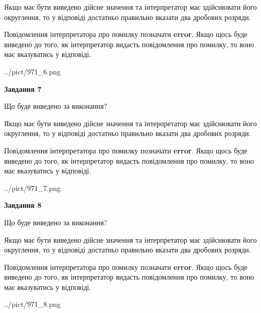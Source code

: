 \documentclass[12pt, ukrainian]{article}
\begin{document}
{\begin {Large}
Якщо має бути виведено дійсне значення та інтерпретатор має здійснювати його округлення, 
то у відповіді достатньо правильно вказати два дробових розряди.

Повідомлення інтерпретатора про помилку позначати \textbf{error}.
Якщо щось буде виведено до того, як інтерпретатор видасть повідомлення про помилку, 
то воно має вказуватись у відповіді. \par

\begin{center}
	{../pict/971_6.png}
\end{center}
\newpage

{\begin {center}\textbf{Завдання 7}\end {center}}\par
Що буде виведено за виконання? \par

Якщо має бути виведено дійсне значення та інтерпретатор має здійснювати його округлення, 
то у відповіді достатньо правильно вказати два дробових розряди.

Повідомлення інтерпретатора про помилку позначати \textbf{error}.
Якщо щось буде виведено до того, як інтерпретатор видасть повідомлення про помилку, 
то воно має вказуватись у відповіді. \par

\begin{center}
	{../pict/971_7.png}
\end{center}
\newpage

{\begin {center}\textbf{Завдання 8}\end {center}}\par
Що буде виведено за виконання? \par

Якщо має бути виведено дійсне значення та інтерпретатор має здійснювати його округлення, 
то у відповіді достатньо правильно вказати два дробових розряди.

Повідомлення інтерпретатора про помилку позначати \textbf{error}.
Якщо щось буде виведено до того, як інтерпретатор видасть повідомлення про помилку, 
то воно має вказуватись у відповіді. \par

\begin{center}
	{../pict/971_8.png}
\end{center}
\newpage


\end{Large}}
\end{document}
